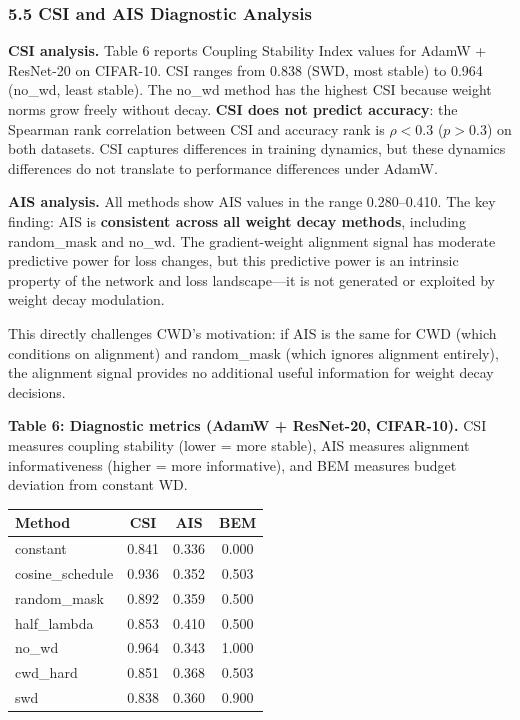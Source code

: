 \documentclass[
]{article}
\begin{document}
\hypertarget{csi-and-ais-diagnostic-analysis}{%
\subsubsection{5.5 CSI and AIS Diagnostic
Analysis}\label{csi-and-ais-diagnostic-analysis}}

\textbf{CSI analysis.} Table 6 reports Coupling Stability Index values
for AdamW + ResNet-20 on CIFAR-10. CSI ranges from 0.838 (SWD, most
stable) to 0.964 (no\_wd, least stable). The no\_wd method has the
highest CSI because weight norms grow freely without decay. \textbf{CSI
does not predict accuracy}: the Spearman rank correlation between CSI
and accuracy rank is \(\rho < 0.3\) (\(p > 0.3\)) on both datasets. CSI
captures differences in training dynamics, but these dynamics
differences do not translate to performance differences under AdamW.

\textbf{AIS analysis.} All methods show AIS values in the range
0.280--0.410. The key finding: AIS is \textbf{consistent across all
weight decay methods}, including random\_mask and no\_wd. The
gradient-weight alignment signal has moderate predictive power for loss
changes, but this predictive power is an intrinsic property of the
network and loss landscape---it is not generated or exploited by weight
decay modulation.

This directly challenges CWD's motivation: if AIS is the same for CWD
(which conditions on alignment) and random\_mask (which ignores
alignment entirely), the alignment signal provides no additional useful
information for weight decay decisions.

\textbf{Table 6: Diagnostic metrics (AdamW + ResNet-20, CIFAR-10).} CSI
measures coupling stability (lower = more stable), AIS measures
alignment informativeness (higher = more informative), and BEM measures
budget deviation from constant WD.

\begin{longtable}[]{@{}lccc@{}}
\toprule\noalign{}
Method & CSI & AIS & BEM \\
\midrule\noalign{}
\endhead
\bottomrule\noalign{}
\endlastfoot
constant & 0.841 & 0.336 & 0.000 \\
cosine\_schedule & 0.936 & 0.352 & 0.503 \\
random\_mask & 0.892 & 0.359 & 0.500 \\
half\_lambda & 0.853 & 0.410 & 0.500 \\
no\_wd & 0.964 & 0.343 & 1.000 \\
cwd\_hard & 0.851 & 0.368 & 0.503 \\
swd & 0.838 & 0.360 & 0.900 \\
\end{longtable}
\end{document}
